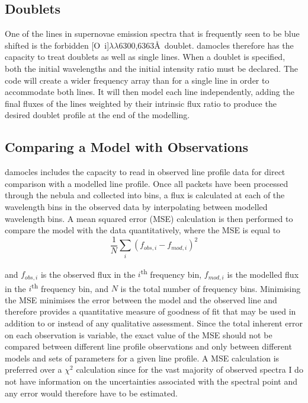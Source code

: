         \subsection{Doublets}

        One of the lines in supernovae emission spectra that is frequently seen to be blue shifted is the forbidden [O~{\sc i}]$\lambda\lambda$6300,6363\AA\ doublet.  {\sc damocles} therefore has the capacity to treat doublets as well as single lines.  When a doublet is specified, both the initial wavelengths and the initial intensity ratio must be declared.  The code will create a wider frequency array than for a single line in order to accommodate both lines.  It will then model each line independently, adding the final fluxes of the lines weighted by their intrinsic flux ratio to produce the desired doublet profile at the end of the modelling. 

        \subsection{Comparing a Model with Observations}

        {\sc damocles} includes the capacity to read in observed line profile data for direct comparison with a modelled line profile.  Once all packets have been processed through the nebula and collected into bins, a flux is calculated at each of the wavelength bins in the observed data by interpolating between modelled wavelength bins.  A mean squared error (MSE) calculation is then performed to compare the model with the data quantitatively, where the MSE is equal to	
        \begin{equation}
        \label{eqn:chi2}
        \frac{1}{N} \sum_i (f_{obs,i}- f_{mod,i})^2
        \end{equation}		
        
        \noindent and $f_{obs,i}$ is the observed flux in the $i$\textsuperscript{th} frequency bin, $f_{mod,i}$ is the modelled flux in the $i$\textsuperscript{th} frequency bin, and $N$ is the total number of frequency bins.   Minimising the MSE minimises the error between the model and the observed line and therefore provides a quantitative measure of goodness of fit that may be used in addition to or instead of any qualitative assessment.  Since the total inherent error on each observation is variable, the exact value of the MSE should not be compared between different line profile observations and only between different models and sets of parameters for a given line profile.  A MSE calculation is preferred over a $\chi^2$ calculation since for the vast majority of observed spectra I do not have information on the uncertainties associated with the spectral point and any error would therefore have to be estimated.
        
